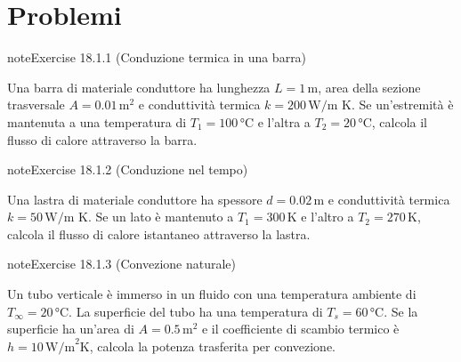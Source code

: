 \documentclass[letterpaper,10pt,italian]{jupyterBook}
\begin{document}
\section{Problemi}
\label{\detokenize{ch/thermodynamics/heat-transmission-problems:problemi}}\label{\detokenize{ch/thermodynamics/heat-transmission-problems:physics-hs-thermodynamics-heat-transmission-problems}}\label{\detokenize{ch/thermodynamics/heat-transmission-problems::doc}} \label{exercise:ch/thermodynamics/heat-transmission-problems-exercise-0}

\begin{sphinxadmonition}{note}{Exercise 18.1.1 (Conduzione termica in una barra)}



\sphinxAtStartPar
Una barra di materiale conduttore ha lunghezza \(L = 1 \, \text{m}\), area della sezione trasversale \(A = 0.01 \, \text{m}^2\) e conduttività termica \(k = 200 \, \text{W/m K}\). Se un’estremità è mantenuta a una temperatura di \(T_1 = 100 \, \text{°C}\) e l’altra a \(T_2 = 20 \, \text{°C}\), calcola il flusso di calore attraverso la barra.
\end{sphinxadmonition}
 \label{exercise:ch/thermodynamics/heat-transmission-problems-exercise-1}

\begin{sphinxadmonition}{note}{Exercise 18.1.2 (Conduzione nel tempo)}



\sphinxAtStartPar
Una lastra di materiale conduttore ha spessore \(d = 0.02 \, \text{m}\) e conduttività termica \(k = 50 \, \text{W/m K}\). Se un lato è mantenuto a \(T_1 = 300 \, \text{K}\) e l’altro a \(T_2 = 270 \, \text{K}\), calcola il flusso di calore istantaneo attraverso la lastra.
\end{sphinxadmonition}
 \label{exercise:ch/thermodynamics/heat-transmission-problems-exercise-2}

\begin{sphinxadmonition}{note}{Exercise 18.1.3 (Convezione naturale)}



\sphinxAtStartPar
Un tubo verticale è immerso in un fluido con una temperatura ambiente di \(T_\infty = 20 \, \text{°C}\). La superficie del tubo ha una temperatura di \(T_s = 60 \, \text{°C}\). Se la superficie ha un’area di \(A = 0.5 \, \text{m}^2\) e il coefficiente di scambio termico è \(h = 10 \, \text{W/m}^2\text{K}\), calcola la potenza trasferita per convezione.
\end{sphinxadmonition}
 \label{exercise:ch/thermodynamics/heat-transmission-problems-exercise-3}
\end{document}
